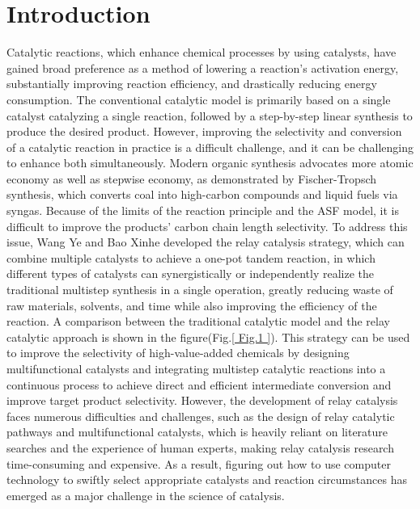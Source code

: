 \documentclass[%
 aip,
 jmp,%
 amsmath,amssymb,
 reprint,%
]{revtex4-2}
\begin{document}
\section{Introduction}
Catalytic reactions\cite{allen2012synergistic}, which enhance chemical processes by using catalysts, have gained broad preference as a method of lowering a reaction's activation energy, substantially improving reaction efficiency, and drastically reducing energy consumption. The conventional catalytic model\cite{somorjai1986structure} is primarily based on a single catalyst catalyzing a single reaction, followed by a step-by-step linear synthesis to produce the desired product. However, improving the selectivity and conversion of a catalytic reaction in practice is a difficult challenge, and it can be challenging to enhance both simultaneously. Modern organic synthesis advocates more atomic economy\cite{trost1991atom} as well as stepwise economy\cite{zhang2019one}, as demonstrated by Fischer-Tropsch synthesis\cite{anderson1984fischer}, which converts coal into high-carbon compounds and liquid fuels via syngas. Because of the limits of the reaction principle and the ASF model\cite{fortsch2015product}, it is difficult to improve the products' carbon chain length selectivity. To address this issue, Wang Ye and Bao Xinhe developed the relay catalysis strategy\cite{wu2013asymmetric}, which can combine multiple catalysts to achieve a one-pot tandem reaction\cite{csekei2008development}, in which different types of catalysts can synergistically or independently realize the traditional multistep synthesis\cite{webb2010continuous} in a single operation, greatly reducing waste of raw materials, solvents, and time while also improving the efficiency of the reaction. A comparison between the traditional catalytic model and the relay catalytic approach is shown in the figure(Fig.\ref{ Fig.1 }). This strategy can be used to improve the selectivity of high-value-added chemicals by designing multifunctional catalysts\cite{felpin2008heterogeneous} and integrating multistep catalytic reactions into a continuous process to achieve direct and efficient intermediate conversion and improve target product selectivity. However, the development of relay catalysis faces numerous difficulties and challenges, such as the design of relay catalytic pathways and multifunctional catalysts, which is heavily reliant on literature searches and the experience of human experts, making relay catalysis research time-consuming and expensive. As a result, figuring out how to use computer technology to swiftly select appropriate catalysts and reaction circumstances has emerged as a major challenge in the science of catalysis.
\end{document}
